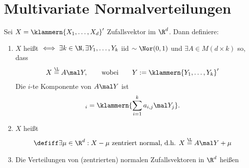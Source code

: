 
\section{Multivariate Normalverteilungen}

\begin{definition}\label{def5.1}
	Sei $X=\klammern{X_1,\ldots,X_d}'$ Zufallsvektor im $\R^d$.
	Dann definiere:
	\begin{enumerate}[label=(\arabic*)]
		\item $X$ heißt 
		$\iff\exists k\in\N,\exists Y_1,\ldots,Y_k$ iid $\sim\Nor(0,1)$ und $\exists A\in M(d\times k)$ so, dass
		\begin{align*}
			X\overset{\L}{=}A\mal Y,
			\qquad\text{wobei}\qquad
			Y:=\klammern{Y_1,\ldots,Y_k}'
		\end{align*}
		Die $i$-te Komponente von $A\mal Y$ ist
		\begin{align*}
			[A\mal Y]_i=\klammern{\sum\limits_{i=1}^k a_{i,j}\mal Y_j}.
		\end{align*}				
		\label{item:def5.1_1}
		\item $X$ heißt 
		\begin{align*}
			\defiff\exists\mu\in\R^d:X-\mu\text{ zentriert normal, d.h. }
			X\overset{\L}{=}A\mal Y+\mu
		\end{align*}
		\label{item:def5.1_2}
		\item Die Verteilungen von (zentrierten) normalen Zufallsvektoren in $\R^d$ heißen 
		\label{item:def5.1_3}
	\end{enumerate}
\end{definition}

